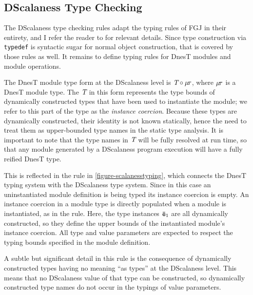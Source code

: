 \subsection{DScalaness Type Checking}
\label{section-scalaness-typing}

\scalanesstypingfig

The DScalaness type checking rules adapt the typing rules of FGJ in their entirety, and I refer
the reader to \cite{FJ} for relevant details. Since type construction via \texttt{typedef} is
syntactic sugar for normal object construction, that is covered by those rules as well. It
remains to define typing rules for DnesT modules and module operations.

The DnesT module type form at the DScalaness level is $\textit{T} \circ \mu\!\tau$, where
$\mu\!\tau$ is a DnesT module type. The $\textit{T}$ in this form represents the type bounds of
dynamically constructed types that have been used to instantiate the module; we refer to this
part of the type as the \emph{instance coercion}. Because these types are dynamically
constructed, their identity is not known statically, hence the need to treat them as
upper-bounded type names in the static type analysis. It is important to note that the type
names in $\textit{T}$ will be fully resolved at run time, so that any module generated by a
DScalaness program execution will have a fully reified DnesT type.

This is reflected in the  rule in \autoref{figure-scalanesstyping}, which connects
the DnesT typing system with the DScalaness type system. Since in this case an uninstantiated
module definition is being typed its instance coercion is empty. An instance coercion in a
module type is directly populated when a module is instantiated, as in the 
rule. Here, the type instances ${\mathtt{\bar{e}}}_1$ are all dynamically constructed, so they define the
upper bounds of the instantiated module's instance coercion. All type and value parameters are
expected to respect the typing bounds specified in the module definition.

A subtle but significant detail in this rule is the consequence of dynamically constructed types
having no meaning ``as types'' at the DScalaness level. This means that no DScalaness value of
that type can be constructed, so dynamically constructed type names do not occur in the typings
of value parameters.

